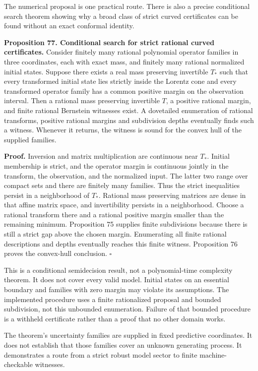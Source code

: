 The numerical proposal is one practical route. There is also a precise
conditional search theorem showing why a broad class of strict curved
certificates can be found without an exact conformal identity.

\textbf{Proposition 77. Conditional search for strict rational curved
certificates.} Consider finitely many rational polynomial operator
families in three coordinates, each with exact mass, and finitely many
rational normalized initial states. Suppose there exists a real mass
preserving invertible \(T_*\) such that every transformed initial state
lies strictly inside the Lorentz cone and every transformed operator
family has a common positive margin on the observation interval. Then a
rational mass preserving invertible \(T\), a positive rational margin,
and finite rational Bernstein witnesses exist. A dovetailed enumeration
of rational transforms, positive rational margins and subdivision depths
eventually finds such a witness. Whenever it returns, the witness is
sound for the convex hull of the supplied families.

\textbf{Proof.} Inversion and matrix multiplication are continuous near
\(T_*\). Initial membership is strict, and the operator margin is
continuous jointly in the transform, the observation, and the normalized
input. The latter two range over compact sets and there are finitely
many families. Thus the strict inequalities persist in a neighborhood of
\(T_*\). Rational mass preserving matrices are dense in that affine
matrix space, and invertibility persists in a neighborhood. Choose a
rational transform there and a rational positive margin smaller than the
remaining minimum. Proposition 75 supplies finite subdivisions because
there is still a strict gap above the chosen margin. Enumerating all
finite rational descriptions and depths eventually reaches this finite
witness. Proposition 76 proves the convex-hull conclusion. \(\square\)

This is a conditional semidecision result, not a polynomial-time
complexity theorem. It does not cover every valid model. Initial states
on an essential boundary and families with zero margin may violate its
assumptions. The implemented procedure uses a finite rationalized
proposal and bounded subdivision, not this unbounded enumeration.
Failure of that bounded procedure is a withheld certificate rather than
a proof that no other domain works.

The theorem's uncertainty families are supplied in fixed predictive
coordinates. It does not establish that those families cover an unknown
generating process. It demonstrates a route from a strict robust model
sector to finite machine-checkable witnesses.

